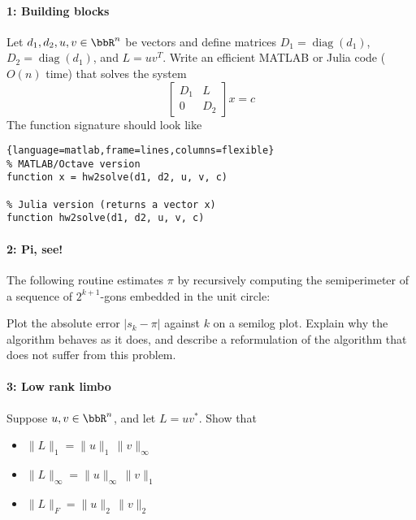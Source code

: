 \documentclass[12pt, leqno]{article}
\begin{document}

\paragraph{1: Building blocks}
Let $d_1, d_2, u, v \in \bbR^n$ be vectors and define matrices
$D_1 = \operatorname{diag}(d_1)$, $D_2 = \operatorname{diag}(d_1)$,
and $L = uv^T$.  Write an efficient MATLAB or Julia code ($O(n)$ time)
that solves the system
\[
  \begin{bmatrix} D_1 & L \\ 0 & D_2 \end{bmatrix} x = c
\]
The function signature should look like
\begin{lstlisting}{language=matlab,frame=lines,columns=flexible}
% MATLAB/Octave version
function x = hw2solve(d1, d2, u, v, c)

% Julia version (returns a vector x)
function hw2solve(d1, d2, u, v, c)
\end{lstlisting}

\paragraph*{2: Pi, see!}
The following routine estimates $\pi$ by recursively computing the
semiperimeter of a sequence of $2^{k+1}$-gons embedded in the unit circle:
\lstset{language=matlab,frame=lines,columns=flexible}

Plot the absolute error $|s_k-\pi|$ against $k$ on a semilog plot.
Explain why the algorithm behaves as it does, and describe a
reformulation of the algorithm that does not suffer from this problem.

\paragraph*{3: Low rank limbo}
Suppose $u, v \in \bbR^n$, and let $L = uv^*$.  Show that
\begin{itemize}
\item $\|L\|_1 = \|u\|_1 \, \|v\|_\infty$
\item $\|L\|_\infty = \|u\|_\infty \, \|v\|_1$
\item $\|L\|_F = \|u\|_2 \, \|v\|_2$
\end{itemize}
\end{document}
